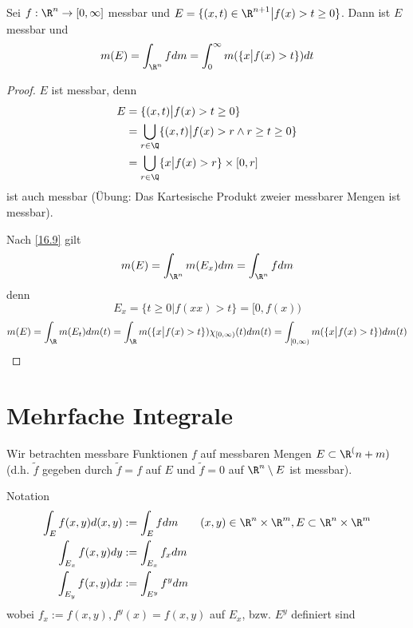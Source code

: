 \documentclass{mycourse}
\begin{document}
\begin{st}
	\label{16.11}
	Sei $f:\R^n\to [0,\infty]$ messbar und $E = \{(x,t)\in \R^{n+1} \big| f(x) > t \ge 0\}$.
	Dann ist $E$ messbar und
	\[
		m(E) = \int_{\R^n} f dm = \int_0^\infty m(\{x\big| f(x) > t\})dt
	\]
	\begin{proof}
		$E$ ist messbar, denn
		\begin{align*}
			E &= \{(x,t) \big| f(x) > t\ge 0\}\\
		   	&= \bigcup_{r\in \Q}\{(x,t)\big| f(x) > r\land r\ge t\ge 0\} \\
			&=\bigcup_{r\in \Q}\{x\big| f(x) > r\} \times [0,r]\\
		\end{align*}
		ist auch messbar (Übung: Das Kartesische Produkt zweier messbarer Mengen ist messbar).

		Nach \ref{16.9} gilt
		\[
			m(E) = \int_{\R^n}m(E_x) dm = \int_{\R^n}f dm
		\]
		denn
		\[
			E_x = \{t\ge 0\big| f(xx) > t\} = [0,f(x))
		\]
		\[
			m(E) = \int_\R m(E_t)dm(t) = \int_{\R}m(\{x\big|f(x)>t\})\chi_{[0,\infty)}(t) dm(t)
			= \int_{[0,\infty)} m(\{x\big|f(x)>t\})dm(t)
		\]
	\end{proof}
\end{st}


\section{Mehrfache Integrale}


Wir betrachten messbare Funktionen $f$ auf messbaren Mengen $E\subset \R^(n+m)$ (d.h. $\tilde f$ gegeben durch $\tilde f=f$ auf $E$ und $\tilde f=0$ auf $\R^n\setminus E$ ist messbar).

\begin{seg}{Notation}
	\begin{align*}
		\int_E f(x,y) d(x,y) &:= \int_E fdm \qquad (x,y)\in \R^n\times \R^m, E\subset \R^n\times \R^m\\
		\int_{E_x}f(x,y) dy &:= \int_{E_x}f_x dm\\
		\int_{E_y}f(x,y) dx &:= \int_{E^y}f^y dm
	\end{align*}
	wobei $f_x := f(x,y), f^y(x) = f(x,y)$ auf $E_x$, bzw. $E^y$ definiert sind
\end{seg}
\end{document}

